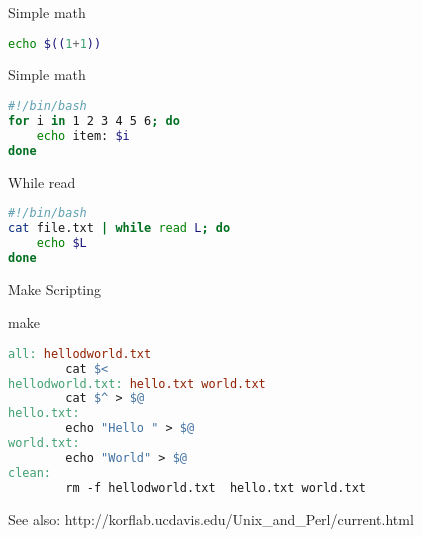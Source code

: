 \documentclass{beamer}
\begin{document}
\begin{frame}[fragile]
 \begin{center}
    \huge{Simple math}\\
    \end{center}
\begin{lstlisting}[language=bash]
echo $((1+1)) 
\end{lstlisting}
\end{frame}

\begin{frame}[fragile]
 \begin{center}
    \huge{Simple math}\\
    \end{center}
\begin{lstlisting}[language=bash]
#!/bin/bash
for i in 1 2 3 4 5 6; do
    echo item: $i
done
\end{lstlisting}
\end{frame}

\begin{frame}[fragile]
 \begin{center}
    \huge{While read}\\
    \end{center}
\begin{lstlisting}[language=bash]
#!/bin/bash
cat file.txt | while read L; do
    echo $L
done
\end{lstlisting}
\end{frame}

\begin{frame}[fragile]
 \begin{center}
    \huge{Make Scripting}\\
  \end{center}
\end{frame}


\begin{frame}[fragile]
 \begin{center}
    \huge{make}\\
    \end{center}
\begin{lstlisting}[language=make]
all: hellodworld.txt
        cat $<
hellodworld.txt: hello.txt world.txt
        cat $^ > $@
hello.txt:
        echo "Hello " > $@
world.txt:
        echo "World" > $@
clean:
        rm -f hellodworld.txt  hello.txt world.txt
\end{lstlisting}
\end{frame}


\begin{frame}[fragile]
See  also: 
http://korflab.ucdavis.edu/Unix\_and\_Perl/current.html
\end{frame}
\end{document}
